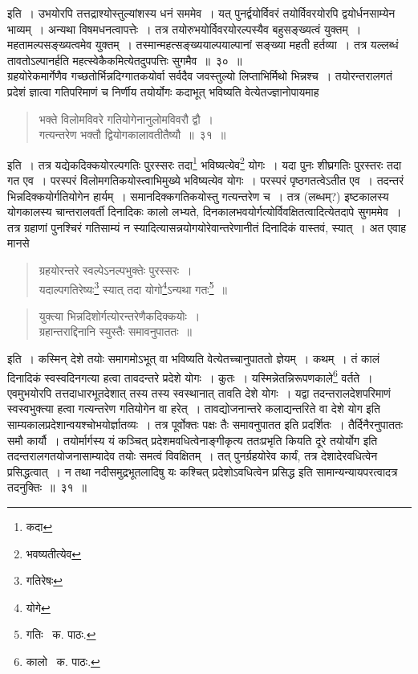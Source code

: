 \documentclass[11pt, openany]{book}
\begin{document}
इति~। उभयोरपि तत्तद्राश्योस्तुल्यांशस्य धनं सममेव~। यत् पुनर्द्वयोर्विवरं तयोर्विवरयोरपि द्वयोर्धनसाम्येन भाव्यम्~। अन्यथा विषमधनत्वापत्तेः~। तत्र तयोरुभयोर्विवरयोरल्पस्यैव बहुसङ्ख्यत्वं युक्तम्~। महतामल्पसङ्ख्यत्वमेव युक्तम्~। तस्मान्महत्सङ्ख्ययाल्पयाल्पानां सङ्ख्या महती हर्तव्या~। तत्र यल्लब्धं तावतोऽल्पानर्हति महत्स्वेकैकमित्येतदुपपत्तिः सुगमैव~॥~३०~॥\\

ग्रहयोरेकमार्गेणैव गच्छतोर्भिन्नदिग्गातकयोर्वा सर्वदैव जवस्तुल्यो लिप्ताभिर्मिथो भिन्नश्च~। तयोरन्तरालगतं प्रदेशं ज्ञात्वा गतिपरिमाणं च निर्णीय
तयोर्योगः कदाभूत् भविष्यति वेत्येतज्ज्ञानोपायमाह\textendash

\begin{quote}
{\ab भक्ते विलोमविवरे गतियोगेनानुलोमविवरौ द्वौ~।\\
गत्यन्तरेण भक्तौ द्वियोगकालावतीतैष्यौ~॥~३१~॥}
\end{quote}

इति~। तत्र यद्येकदिक्कयोरल्पगतिः पुरस्सरः तदा\renewcommand{\thefootnote}{१}\footnote{कदा} भविष्यत्येव\renewcommand{\thefootnote}{२}\footnote{भवष्यतीत्येव} योगः~। यदा पुनः शीघ्रगतिः पुरस्तरः तदा गत एव~। परस्परं विलोमगतिकयोस्त्वाभिमुख्ये भविष्यत्येव योगः~। परस्परं पृष्ठगतत्वेऽतीत एव~। तदन्तरं भिन्नदिक्कयोर्गतियोगेन हार्यम्~। समानदिक्कगतिकयोस्तु गत्यन्तरेण च~। तत्र (लब्धम्?) इष्टकालस्य योगकालस्य चान्तरालवर्ती दिनादिकः कालो लभ्यते, दिनकालभवयोर्गत्योर्विवक्षितत्वादित्येतदापे सुगममेव~। तत्र ग्रहाणां पुनश्चिरं गतिसाम्यं न स्यादित्यासन्नयोगयोरेवान्तरेणानीतं दिनादिकं वास्तवं, स्यात्~। अत एवाह मानसे\textendash

\begin{quote}
{\qt ग्रहयोरन्तरे स्वल्पेऽनल्पभुक्तेः पुरस्सरः~।\\
यदाल्पगतिरेष्यः\renewcommand{\thefootnote}{३}\footnote{गतिरेषः} स्यात् तदा योगो\renewcommand{\thefootnote}{४}\footnote{योगे}ऽन्यथा गतः\renewcommand{\thefootnote}{१}\footnote{गतिः \textendash\ क. पाठः.}~॥}
\end{quote}

\newpage

\begin{quote}
{\qt युक्त्या भिन्नदिशोर्गत्योरन्तरेणैकदिक्कयोः~।\\
ग्रहान्तराद्दिनानि स्युस्तैः समावनुपाततः~॥}
\end{quote}

\noindent इति~। कस्मिन् देशे तयोः समागमोऽभूत् वा भविष्यति वेत्येतच्चानुपाततो ज्ञेयम्~। कथम्~। तं कालं दिनादिकं स्वस्वदिनगत्या हत्वा तावदन्तरे प्रदेशे योगः~। कुतः~। यस्मिन्नेतन्निरूपणकाले\renewcommand{\thefootnote}{१}\footnote{कालो \textendash\ क. पाठः.} वर्तते~। एवमुभयोरपि तत्तदाधारभूतदेशात् तस्य तस्य स्वस्थानात् तावति देशे योगः~। यद्वा तदन्तरालदेशपरिमाणं स्वस्वभुक्त्या हत्वा गत्यन्तरेण गतियोगेन वा हरेत्~। तावद्योजनान्तरे कलाद्यन्तरिते वा देशे योग इति साम्यकालप्रदेशान्वयश्चोभयोर्ज्ञातव्यः~। तत्र पूर्वोक्तः पक्षः {\qt तैः समावनुपातत} इति प्रदर्शितः~। तैर्दिनैरनुपाततः समौ कार्यौ~। तयोर्मार्गस्य यं कञ्चित् प्रदेशमवधित्वेनाङ्गीकृत्य ततःप्रभृति कियति दूरे तयोर्योग इति तदन्तरालगतयोजनासाम्यादेव तयोः समत्वं विवक्षितम्~। तत् पुनर्ग्रहयोरेव कार्यं, तत्र देशादेरवधित्वेन प्रसिद्धत्वात्~। न तथा नदीसमुद्रभूतलादिषु यः कश्चित् प्रदेशोऽवधित्वेन प्रसिद्ध इति सामान्यन्यायपरत्वादत्र तदनुक्तिः~॥~३१~॥\\
\end{document}

